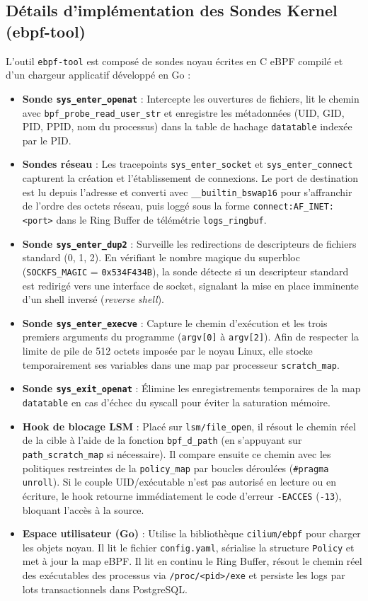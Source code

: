 \documentclass[11pt,a4paper]{article}
\begin{document}
\subsection{Détails d'implémentation des Sondes Kernel (ebpf-tool)}
L'outil \texttt{ebpf-tool} est composé de sondes noyau écrites en C eBPF compilé et d'un chargeur applicatif développé en Go :
\begin{itemize}
    \item \textbf{Sonde \texttt{sys\_enter\_openat}} : Intercepte les ouvertures de fichiers, lit le chemin avec \texttt{bpf\_probe\_read\_user\_str} et enregistre les métadonnées (UID, GID, PID, PPID, nom du processus) dans la table de hachage \texttt{datatable} indexée par le PID.
    \item \textbf{Sondes réseau} : Les tracepoints \texttt{sys\_enter\_socket} et \texttt{sys\_enter\_connect} capturent la création et l'établissement de connexions. Le port de destination est lu depuis l'adresse et converti avec \texttt{\_\_builtin\_bswap16} pour s'affranchir de l'ordre des octets réseau, puis loggé sous la forme \texttt{connect:AF\_INET:<port>} dans le Ring Buffer de télémétrie \texttt{logs\_ringbuf}.
    \item \textbf{Sonde \texttt{sys\_enter\_dup2}} : Surveille les redirections de descripteurs de fichiers standard (0, 1, 2). En vérifiant le nombre magique du superbloc (\texttt{SOCKFS\_MAGIC} = \texttt{0x534F434B}), la sonde détecte si un descripteur standard est redirigé vers une interface de socket, signalant la mise en place imminente d'un shell inversé (\textit{reverse shell}).
    \item \textbf{Sonde \texttt{sys\_enter\_execve}} : Capture le chemin d'exécution et les trois premiers arguments du programme (\texttt{argv[0]} à \texttt{argv[2]}). Afin de respecter la limite de pile de 512 octets imposée par le noyau Linux, elle stocke temporairement ses variables dans une map par processeur \texttt{scratch\_map}.
    \item \textbf{Sonde \texttt{sys\_exit\_openat}} : Élimine les enregistrements temporaires de la map \texttt{datatable} en cas d'échec du syscall pour éviter la saturation mémoire.
    \item \textbf{Hook de blocage LSM} : Placé sur \texttt{lsm/file\_open}, il résout le chemin réel de la cible à l'aide de la fonction \texttt{bpf\_d\_path} (en s'appuyant sur \texttt{path\_scratch\_map} si nécessaire). Il compare ensuite ce chemin avec les politiques restreintes de la \texttt{policy\_map} par boucles déroulées (\texttt{\#pragma unroll}). Si le couple UID/exécutable n'est pas autorisé en lecture ou en écriture, le hook retourne immédiatement le code d'erreur \texttt{-EACCES} (\texttt{-13}), bloquant l'accès à la source.
    \item \textbf{Espace utilisateur (Go)} : Utilise la bibliothèque \texttt{cilium/ebpf} pour charger les objets noyau. Il lit le fichier \texttt{config.yaml}, sérialise la structure \texttt{Policy} et met à jour la map eBPF. Il lit en continu le Ring Buffer, résout le chemin réel des exécutables des processus via \texttt{/proc/<pid>/exe} et persiste les logs par lots transactionnels dans PostgreSQL.
\end{itemize}
\end{document}

